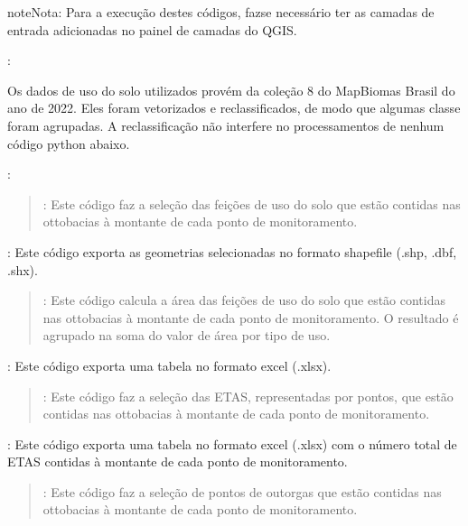 \documentclass[a4paper,10pt,brazil]{sphinxmanual}
\begin{document}
\begin{sphinxadmonition}{note}{Nota:}
\sphinxAtStartPar
Para a execução destes códigos, faz\sphinxhyphen{}se necessário ter as camadas de entrada adicionadas no painel de camadas do QGIS.
\end{sphinxadmonition}

\sphinxAtStartPar
{}:

\sphinxAtStartPar
Os dados de uso do solo utilizados provém da coleção 8 do MapBiomas Brasil do ano de 2022. Eles foram vetorizados e reclassificados, de modo que algumas classe foram agrupadas. A reclassificação não interfere no processamentos de nenhum código python abaixo.

\sphinxAtStartPar
{}:
\begin{quote}

\sphinxAtStartPar
{}: Este código faz a seleção das feições de uso do solo que estão contidas nas ottobacias à montante de cada ponto de monitoramento.
\end{quote}

\sphinxAtStartPar
{}: Este código exporta as geometrias selecionadas no formato shapefile (.shp, .dbf, .shx).
\begin{quote}

\sphinxAtStartPar
{}: Este código calcula a área das feições de uso do solo que estão contidas nas ottobacias à montante de cada ponto de monitoramento. O resultado é agrupado na soma do valor de área por tipo de uso.
\end{quote}

\sphinxAtStartPar
{}: Este código exporta uma tabela no formato excel (.xlsx).
\begin{quote}

\sphinxAtStartPar
{}: Este código faz a seleção das ETAS, representadas por pontos, que estão contidas nas ottobacias à montante de cada ponto de monitoramento.
\end{quote}

\sphinxAtStartPar
{}: Este código exporta uma tabela no formato excel (.xlsx) com o número total de ETAS contidas à montante de cada ponto de monitoramento.
\begin{quote}

\sphinxAtStartPar
{}: Este código faz a seleção de pontos de outorgas que estão contidas nas ottobacias à montante de cada ponto de monitoramento.
\end{quote}
\end{document}
